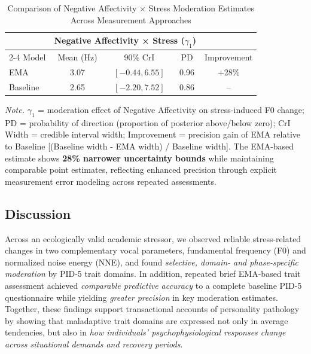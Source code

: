 \documentclass[
  english,
  man]{apa6}
\begin{document}
\begin{table}[h]
\caption{Comparison of Negative Affectivity × Stress Moderation Estimates Across Measurement Approaches}
\label{tab:na-stress-moderation-comparison}
\small
\begin{tabular}{lcccc}
\hline
 & \multicolumn{3}{c}{Negative Affectivity × Stress ($\gamma_1$)} & \\
\cmidrule(lr){2-4}
Model & Mean (Hz) & 90\% CrI & PD & Improvement \\
\hline
EMA & 3.07 & $[-0.44, 6.55]$ & 0.96 & +28\% \\
Baseline & 2.65 & $[-2.20, 7.52]$ & 0.86 & -- \\
\hline
\end{tabular}
\begin{tablenotes}
\small
\item \textit{Note.} $\gamma_1$ = moderation effect of Negative Affectivity on stress-induced F0 change; PD = probability of direction (proportion of posterior above/below zero); CrI Width = credible interval width; Improvement = precision gain of EMA relative to Baseline [(Baseline width - EMA width) / Baseline width]. The EMA-based estimate shows \textbf{28\% narrower uncertainty bounds} while maintaining comparable point estimates, reflecting enhanced precision through explicit measurement error modeling across repeated assessments.
\end{tablenotes}
\end{table}

\subsection{Discussion}\label{discussion}

Across an ecologically valid academic stressor, we observed reliable stress-related changes in two complementary vocal parameters, fundamental frequency (F0) and normalized noise energy (NNE), and found \emph{selective, domain- and phase-specific moderation} by PID-5 trait domains. In addition, repeated brief EMA-based trait assessment achieved \emph{comparable predictive accuracy} to a complete baseline PID-5 questionnaire while yielding \emph{greater precision} in key moderation estimates. Together, these findings support transactional accounts of personality pathology by showing that maladaptive trait domains are expressed not only in average tendencies, but also in \emph{how individuals' psychophysiological responses change across situational demands and recovery periods}.
\end{document}
